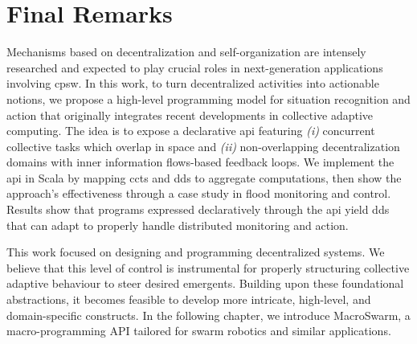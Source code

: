 \section{Final Remarks}\label{sec:conc}

Mechanisms based on decentralization and self-organization
 are intensely researched
 and expected to play crucial roles in 
 next-generation applications
 involving \ac{cpsw}.
%
In this work,
 to turn decentralized activities into actionable notions,
 we propose a high-level programming model
 for situation recognition and action
 that originally integrates 
 recent developments
 in collective adaptive computing.
%
The idea is to expose a declarative \ac{api}
featuring
 \emph{(i)} concurrent collective tasks which overlap in space
 and
 \emph{(ii)} non-overlapping decentralization domains
 with inner information flows-based feedback loops.
%
We implement the \ac{api} in Scala
 by mapping \acp{cct} and \acp{dd}
 to \scafi{} aggregate computations,
 then show the approach's effectiveness
 through a case study in flood monitoring and control.
%
Results show that programs expressed declaratively through the \ac{api}
yield \acp{dd}
that can adapt to properly handle distributed monitoring and action.

This work focused on designing and programming 
 decentralized systems.
%
We believe that this level of control 
 is instrumental for properly structuring
 collective adaptive behaviour
 to steer desired emergents.
%
Building upon these foundational abstractions, 
 it becomes feasible to develop more intricate, high-level, and domain-specific constructs. 
 In the following chapter, we introduce MacroSwarm, 
 a macro-programming API tailored for swarm robotics and similar applications.
